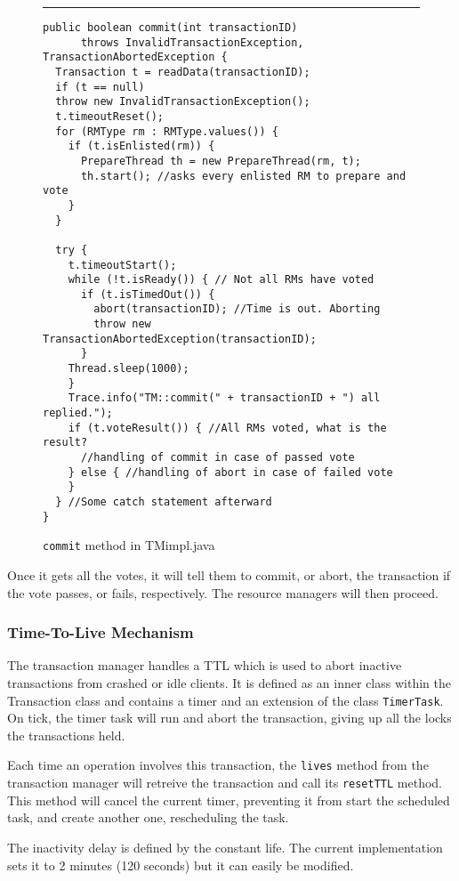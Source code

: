 \documentclass[12pt]{article}
\theoremstyle{plain}%
\theoremstyle{definition}
\theoremstyle{remark}
\newcommand{\java}[1]{{\lstinline!#1!}}
\newenvironment{figureone}[1]{%
  \def\deffigurecaption{#1}%
  \begin{figure}[htbp]%
  \begin{center}%
  \begin{minipage}{\columnwidth}%
  \hrule \vspace*{2ex}%
}{%
  \end{minipage}%
  \end{center}%
  \caption{\deffigurecaption}%
  \end{figure}%
}
\begin{document}
\begin{figureone}{\java{commit} method in TMimpl.java \label{fig:prep}}
\begin{lstlisting}
public boolean commit(int transactionID) 
      throws InvalidTransactionException, TransactionAbortedException {
  Transaction t = readData(transactionID);
  if (t == null)
  throw new InvalidTransactionException();
  t.timeoutReset();
  for (RMType rm : RMType.values()) {
    if (t.isEnlisted(rm)) {
      PrepareThread th = new PrepareThread(rm, t);
      th.start(); //asks every enlisted RM to prepare and vote
    }
  }
  
  try {
    t.timeoutStart();
    while (!t.isReady()) { // Not all RMs have voted
      if (t.isTimedOut()) { 
        abort(transactionID); //Time is out. Aborting 
        throw new TransactionAbortedException(transactionID);
      }
    Thread.sleep(1000);
    }
    Trace.info("TM::commit(" + transactionID + ") all replied.");
    if (t.voteResult()) { //All RMs voted, what is the result?
      //handling of commit in case of passed vote
    } else { //handling of abort in case of failed vote
    }
  } //Some catch statement afterward
}
\end{lstlisting}
\end{figureone}

Once it gets all the votes, it will tell them to commit, or abort, the 
transaction if the vote passes, or fails, respectively. The resource
managers will then proceed.

\subsubsection{Time-To-Live Mechanism\label{sec:ttl}}

The transaction manager handles a TTL which is used to abort inactive 
transactions from crashed or idle clients. It is defined as an inner 
class within the Transaction class and contains a timer and an extension 
of the class \java{TimerTask}. On tick, the timer task will run and abort 
the transaction, giving up all the locks the transactions held. 

Each time an operation involves this transaction, the \java{lives} method 
from the transaction manager will retreive the transaction and call its 
\java{resetTTL} method. This method will cancel the current timer, 
preventing it from start the scheduled task, and create another one, 
rescheduling the task.

The inactivity delay is defined by the constant life. The current 
implementation sets it to 2 minutes (120 seconds) but it can easily be 
modified.
\end{document}
